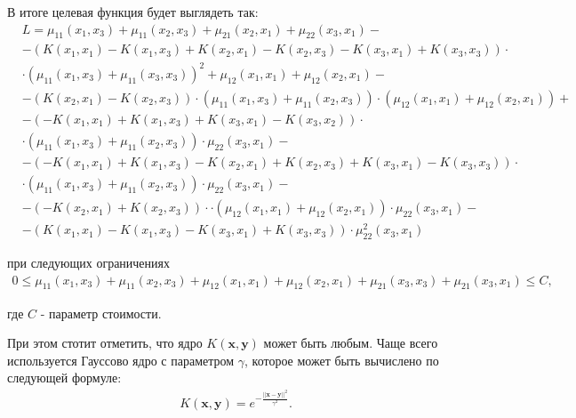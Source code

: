 \documentclass[12pt,a4paper,oneside]{article}
\begin{document}
\par
В итоге целевая функция будет выглядеть так:
\mbox{}
\begin{eqnarray*}
&L = \mu_{11}(x_1, x_3) + \mu_{11}(x_2, x_3) + \mu_{21}(x_2, x_1) + \mu_{22}(x_3, x_1) - \\
&- (K(x_1, x_1) - K(x_1, x_3) + K(x_2, x_1) - K(x_2, x_3) - K(x_3, x_1) + K(x_3, x_ 3)) \cdot \\
&\cdot (\mu_{11}(x_1, x_3) + \mu_{11}(x_3, x_3))^{2} + \mu_{12}(x_1, x_1) + \mu_{12}(x_2, x_1) - \\
&- (K(x_2, x_1) - K(x_2, x_3)) \cdot (\mu_{11}(x_1, x_3) + \mu_{11}(x_2, x_3)) \cdot (\mu_{12}(x_1, x_1) + \mu_{12}(x_2, x_1)) +\\
&- (-K(x_1, x_1) + K(x_1, x_3) + K(x_3, x_1) - K(x_3, x_2)) \cdot \\
&\cdot (\mu_{11}(x_1, x_3) + \mu_{11}(x_2, x_3)) \cdot \mu_{22}(x_3, x_1) - \\
&- (-K(x_1, x_1) + K(x_1, x_3) - K(x_2, x_1) + K(x_2, x_3) + K(x_3, x_1) - K(x_3, x_3)) \cdot \\
& \cdot (\mu_{11}(x_1, x_3) + \mu_{11}(x_2, x_3)) \cdot \mu_{22}(x_3, x_1) -\\
&- (-K(x_2, x_1) + K(x_2, x_3)) \cdot \cdot (\mu_{12}(x_1, x_1) + \mu_{12}(x_2, x_1)) \cdot \mu_{22}(x_3, x_1) - \\
&- (K(x_1, x_1) - K(x_1, x_3) - K(x_3, x_1) + K(x_3, x_3)) \cdot \mu^{2}_{22}(x_3, x_1)
\end{eqnarray*}

\par
при следующих ограничениях
\mbox{}
\begin{eqnarray*}
0 \leq \mu_{11}(x_1, x_3) + \mu_{11}(x_2, x_3) + \mu_{12}(x_1, x_1) + \mu_{12}(x_2, x_1) + \mu_{21}(x_3, x_3) + \mu_{21}(x_3, x_1) \leq C,
\end{eqnarray*}

\par
где \(C\) - параметр стоимости. 

\par
При этом стотит отметить, что ядро \(K(\mathbf{x},\mathbf{y})\) может быть любым. 
Чаще всего используется Гауссово ядро с параметром \(\gamma\), которое может быть вычислено по следующей формуле:
\mbox{}
\begin{eqnarray*}
&K(\mathbf{x}, \mathbf{y}) = e^{-\frac{||\mathbf{x}-\mathbf{y}||^2}{\gamma^{2}}}.
\end{eqnarray*}

\end{document}
